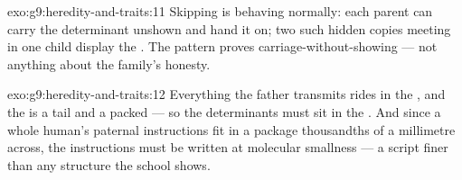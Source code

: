 \begin{solution}{exo:g9:heredity-and-traits:11}
Skipping is  behaving normally: each parent can
carry the  determinant unshown and hand it on; two
such hidden copies meeting in one child display the .
The pattern proves carriage-without-showing --- not
anything about the family's honesty.
\end{solution}

\begin{solution}{exo:g9:heredity-and-traits:12}
Everything the father transmits rides in the ,
and the  is a tail and a packed  ---
so the determinants must sit in the . And since a
whole human's paternal instructions fit in a package
thousandths of a millimetre across, the instructions must
be written at molecular smallness --- a script finer than
any  structure the school  shows.
\end{solution}

